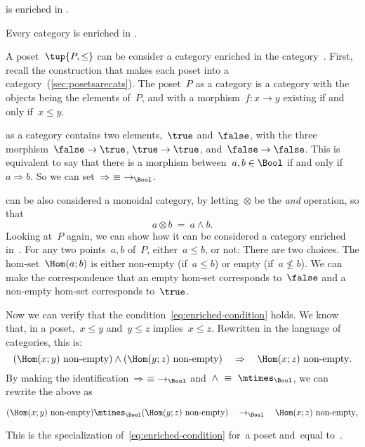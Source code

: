 {\begin{example}
  \Category is enriched in \Category.
\end{example}

\begin{example}
  Every category is enriched in \Set.
\end{example}


\begin{example}
  A poset~$\tup{P, \leq}$ can be consider a category enriched in the
  category~\Bool. First, recall the construction that makes each poset into a
  category~(\cref{sec:posetsarecats}). The poset~$P$ as a category is a category with the objects being the
  elements of~$P$, and with a morphism~$f\colon x \to y$ existing if and only if~$x\leq y$.

  \Bool as a category contains two elements,~$\true$ and~$\false$, with
  the three morphism~$\false \to \true$, $\true \to \true$, and~$\false \to \false$. This is equivalent to say that there is a morphism between~$a, b \in \Bool$ if and only if~$a \Rightarrow b$. So we can set~$\Rightarrow\ \equiv\ \to_{\Bool}$.

  \Bool can be also considered a monoidal category, by letting~$\otimes$ be
  the \emph{and} operation, so that
  \begin{equation}
    a \otimes b\ =\ a \wedge b.
  \end{equation}
  Looking at~$P$ again, we can show how it can be considered a category enriched in~\Bool. For any two points~$a, b$ of~$P$, either~$a \leq b$, or not: There are two choices. The hom-set~$\Hom(a; b)$ is either non-empty
  (if~$a \leq b$) or empty (if~$a \not\leq b$). We can make the correspondence that an empty hom-set corresponds to~$\false$ and a non-empty hom-set corresponds to~$\true$.

  Now we can verify that the condition~\cref{eq:enriched-condition} holds. We
  know that, in a poset,~$x \leq y$ and~$y \leq z$ implies~$x \leq z$.
%
  Rewritten in the language of categories, this is:
  \begin{equation*}
  (\Hom(x;y)\ \text{non-empty})
    \wedge
    (\Hom(y; z)\ \text{non-empty})
    \quad
    \Rightarrow
    \quad
    \Hom(x; z)\ \text{non-empty}.
  \end{equation*}
  By making the identification~$\Rightarrow\ \equiv\ \to_{\Bool}$ and~$\wedge\ \equiv\ \mtimes_{\Bool}$, we can rewrite the above as
  \begin{widepar}
  \begin{equation*}
  (\Hom(x;y)\ \text{non-empty})
    \mtimes_{\Bool}
    (\Hom(y; z)\ \text{non-empty})
    \quad
    \to_{\Bool}
    \quad
    \Hom(x; z)\ \text{non-empty},
  \end{equation*}
  \end{widepar}
  This is the specialization of~\cref{eq:enriched-condition}
  for~\CatC a poset and~\CatD equal to~\Bool.
\end{example}

}
